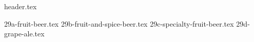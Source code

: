 \clearpage
{}
\divisorLine
{header.tex}
\begin{multicols}{2}
{29a-fruit-beer.tex}
{29b-fruit-and-spice-beer.tex}
{29c-specialty-fruit-beer.tex}
{29d-grape-ale.tex}
\end{multicols}
